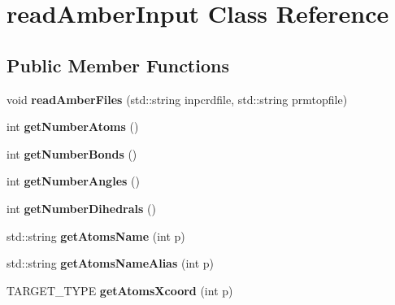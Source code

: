 \hypertarget{classreadAmberInput}{}\section{read\+Amber\+Input Class Reference}
\label{classreadAmberInput}
\subsection*{Public Member Functions}
\begin{DoxyCompactItemize}
\item 
void {\bfseries read\+Amber\+Files} (std\+::string inpcrdfile, std\+::string prmtopfile)\hypertarget{classreadAmberInput_aa600d563dfa61766e1a68735865e6876}{}\label{classreadAmberInput_aa600d563dfa61766e1a68735865e6876}

\item 
int {\bfseries get\+Number\+Atoms} ()\hypertarget{classreadAmberInput_aa2f5f3bba0f03423fee96ffac552b931}{}\label{classreadAmberInput_aa2f5f3bba0f03423fee96ffac552b931}

\item 
int {\bfseries get\+Number\+Bonds} ()\hypertarget{classreadAmberInput_a12bc2be5dc11de2a60c2c61ed7f5a3a3}{}\label{classreadAmberInput_a12bc2be5dc11de2a60c2c61ed7f5a3a3}

\item 
int {\bfseries get\+Number\+Angles} ()\hypertarget{classreadAmberInput_ac1ea3b73555c2ed23e9b74a00a978b87}{}\label{classreadAmberInput_ac1ea3b73555c2ed23e9b74a00a978b87}

\item 
int {\bfseries get\+Number\+Dihedrals} ()\hypertarget{classreadAmberInput_aa316d2196327c29f6fb98ab219e16c5b}{}\label{classreadAmberInput_aa316d2196327c29f6fb98ab219e16c5b}

\item 
std\+::string {\bfseries get\+Atoms\+Name} (int p)\hypertarget{classreadAmberInput_ae7c1b171d9612fd2566f187f055fef6b}{}\label{classreadAmberInput_ae7c1b171d9612fd2566f187f055fef6b}

\item 
std\+::string {\bfseries get\+Atoms\+Name\+Alias} (int p)\hypertarget{classreadAmberInput_ac9a860f480e27f8e7dbb9df29f3d64cf}{}\label{classreadAmberInput_ac9a860f480e27f8e7dbb9df29f3d64cf}

\item 
T\+A\+R\+G\+E\+T\+\_\+\+T\+Y\+PE {\bfseries get\+Atoms\+Xcoord} (int p)\hypertarget{classreadAmberInput_af863c7bc9285c530688203ec32b28a51}{}\label{classreadAmberInput_af863c7bc9285c530688203ec32b28a51}


\end{DoxyCompactItemize}
